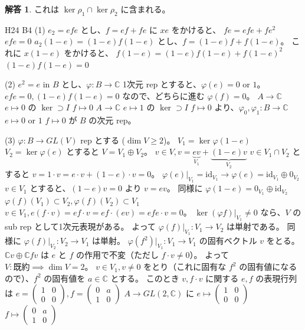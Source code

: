 \documentclass[12pt]{jlreq}
\theoremstyle{definition}
\newtheorem*{solution}{解答}
\begin{document}
\begin{solution}
これは $\ker \rho_1 \cap \ker \rho_2$ に含まれる。

H24 B4
(1) $e_2 = efe$ とし、$f = ef + fe$ に $xe$ をかけると、
$fe = efe + fe^2$
$efe = 0$
$a_2(1-e) = (1-e)f(1-e)$ とし、$f = (1-e)f + f(1-e)$。
これに $x(1-e)$ をかけると、
$f(1-e) = (1-e)f(1-e) + f(1-e)^2$
$(1-e)f(1-e) = 0$

(2) $e^2 = e$ in $B$ とし、$\varphi: B \to \mathbb{C}$ 1次元 rep とすると、$\varphi(e) = 0$ or $1$。
$efe = 0, (1-e)f(1-e) = 0$ なので、どちらに進む $\varphi(f) = 0$。
$A \to \mathbb{C}$
$e \mapsto 0$ の $\ker \supset I$
$f \mapsto 0$
$A \to \mathbb{C}$
$e \mapsto 1$ の $\ker \supset I$
$f \mapsto 0$
より、$\varphi_0, \varphi_1: B \to \mathbb{C}$
$e \mapsto 0$ or $1$
$f \mapsto 0$
が $B$ の次元 rep。

(3) $\varphi: B \to GL(V)$ rep とする ($\dim V \ge 2$)。
$V_1 = \ker \varphi(1-e)$
$V_2 = \ker \varphi(e)$
とすると $V = V_1 \oplus V_2$。
$v \in V, v = \underbrace{ev}_{V_1} + \underbrace{(1-e)v}_{V_2}$
$v \in V_1 \cap V_2$ とすると $v = 1 \cdot v = e \cdot v + (1-e) \cdot v = 0$。
$\varphi(e)|_{V_1} = \text{id}_{V_1} \to \varphi(e) = \text{id}_{V_1} \oplus 0_{V_2}$
$v \in V_1$ とすると、$(1-e)v = 0$ より $v = ev$。
同様に $\varphi(1-e) = 0_{V_1} \oplus \text{id}_{V_2}$
$\varphi(f)(V_1) \subset V_2, \varphi(f)(V_2) \subset V_1$
$v \in V_1, e(f \cdot v) = ef \cdot v = ef \cdot (ev) = efe \cdot v = 0$。
$\ker (\varphi f)|_{V_1} \neq 0$ なら、$V$ の sub rep として1次元表現がある。
よって $\varphi(f)|_{V_1}: V_1 \to V_2$ は単射である。
同様に $\varphi(f)|_{V_2}: V_2 \to V_1$ は単射。
$\varphi(f^2)|_{V_1}: V_1 \to V_1$ の固有ベクトル $v$ をとる。
$\mathbb{C}v \oplus \mathbb{C}fv$ は $e$ と $f$ の作用で不変（ただし $f \cdot v \neq 0$）。
よって $V: \text{既約} \implies \dim V = 2$。
$v \in V_1, v \neq 0$ をとり（これに固有な $f^2$ の固有値になるので）、$f^2$ の固有値を $a \in \mathbb{C}$ とする。
このとき $v, f \cdot v$ に関する $e, f$ の表現行列は
$e = \begin{pmatrix} 1 & 0 \\ 0 & 0 \end{pmatrix}, f = \begin{pmatrix} 0 & a \\ 1 & 0 \end{pmatrix}$
$A \to GL(2, \mathbb{C})$ に
$e \mapsto \begin{pmatrix} 1 & 0 \\ 0 & 0 \end{pmatrix}$
$f \mapsto \begin{pmatrix} 0 & a \\ 1 & 0 \end{pmatrix}$

\end{solution}
\end{document}
